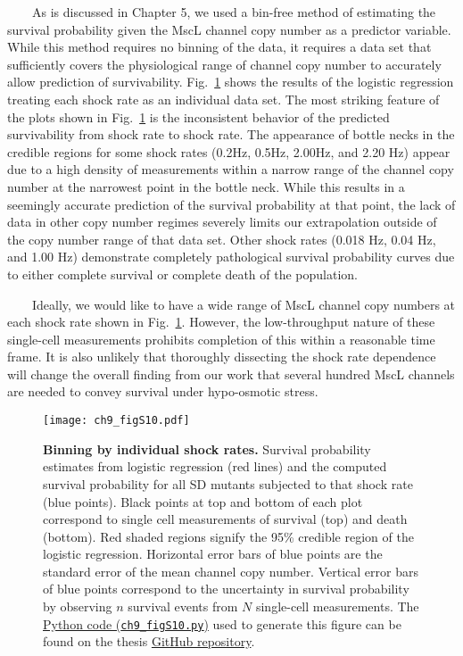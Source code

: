 \documentclass[12pt]{caltech_thesis}
\begin{document}
~~~~As is discussed in Chapter 5, we used a bin-free method of
estimating the survival probability given the MscL channel copy number
as a predictor variable. While this method requires no binning of the
data, it requires a data set that sufficiently covers the physiological
range of channel copy number to accurately allow prediction of
survivability. Fig.~\ref{fig:indiv_shock_group} shows the results of the
logistic regression treating each shock rate as an individual data set.
The most striking feature of the plots shown in
Fig.~\ref{fig:indiv_shock_group} is the inconsistent behavior of the
predicted survivability from shock rate to shock rate. The appearance of
bottle necks in the credible regions for some shock rates (0.2Hz, 0.5Hz,
2.00Hz, and 2.20 Hz) appear due to a high density of measurements within
a narrow range of the channel copy number at the narrowest point in the
bottle neck. While this results in a seemingly accurate prediction of
the survival probability at that point, the lack of data in other copy
number regimes severely limits our extrapolation outside of the copy
number range of that data set. Other shock rates (0.018 Hz, 0.04 Hz, and
1.00 Hz) demonstrate completely pathological survival probability curves
due to either complete survival or complete death of the population.

~~~~Ideally, we would like to have a wide range of MscL channel copy
numbers at each shock rate shown in Fig.~\ref{fig:indiv_shock_group}.
However, the low-throughput nature of these single-cell measurements
prohibits completion of this within a reasonable time frame. It is also
unlikely that thoroughly dissecting the shock rate dependence will
change the overall finding from our work that several hundred MscL
channels are needed to convey survival under hypo-osmotic stress.

\hypertarget{fig:indiv_shock_group}{%
\begin{figure}
\centering
\texttt{[image: ch9\_figS10.pdf]}
\caption[{Binning by individual shock rates.}]{\textbf{Binning by
individual shock rates.} Survival probability estimates from logistic
regression (red lines) and the computed survival probability for all SD
mutants subjected to that shock rate (blue points). Black points at top
and bottom of each plot correspond to single cell measurements of
survival (top) and death (bottom). Red shaded regions signify the 95\%
credible region of the logistic regression. Horizontal error bars of
blue points are the standard error of the mean channel copy number.
Vertical error bars of blue points correspond to the uncertainty in
survival probability by observing \(n\) survival events from \(N\)
single-cell measurements. The
\href{https://github.com/gchure/phd/blob/master/src/chapter_09/code/ch9_figS10.py}{Python
code (\texttt{ch9\_figS10.py})} used to generate this figure can be
found on the thesis \href{https://github.com/gchure/phd}{GitHub
repository}.}
\label{fig:indiv_shock_group}
\end{figure}
}
\end{document}
